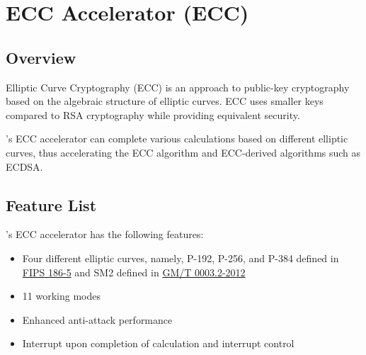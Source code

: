 \documentclass[main\_\_EN.tex]{subfiles}
\begin{document}
\setenglishformatting

\ifglobal
\else
    \clearpage
    \listoftodos
    \listofdonetodos
    \tableofcontents
\fi



\hypertarget{ecc}{}
\chapter{ECC Accelerator (ECC)}
\label{mod:ecc}

\section{Overview}

Elliptic Curve Cryptography (ECC) is an approach to public-key cryptography based on the algebraic structure of elliptic curves. ECC uses smaller keys compared to RSA cryptography while providing equivalent security.

\chipname{}'s ECC accelerator can complete various calculations based on different elliptic curves, thus accelerating the ECC algorithm and ECC-derived algorithms such as ECDSA.

\section{Feature List}

\chipname{}'s ECC accelerator has the following features:

\begin{itemize}
    \item Four different elliptic curves, namely, P-192, P-256, and P-384 defined in \href{https://nvlpubs.nist.gov/nistpubs/FIPS/NIST.FIPS.186-5.pdf}{FIPS 186-5} and SM2 defined in \href{http://www.gmbz.org.cn/file/2018-01-08/f60d13a3-e0fd-40d8-a80f-13fde691ef03.pdf}{GM/T 0003.2-2012}
    \item 11 working modes
    \item Enhanced anti-attack performance
    \item Interrupt upon completion of calculation and interrupt control
\end{itemize}
\end{document}
